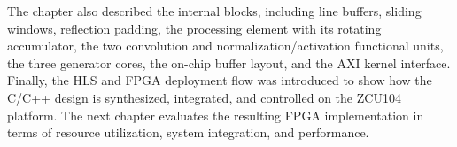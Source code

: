 The chapter also described the internal blocks, including line buffers, sliding windows, reflection padding, the processing element with its rotating accumulator, the two convolution and normalization/activation functional units, the three generator cores, the on-chip buffer layout, and the AXI kernel interface. Finally, the HLS and FPGA deployment flow was introduced to show how the C/C++ design is synthesized, integrated, and controlled on the ZCU104 platform. The next chapter evaluates the resulting FPGA implementation in terms of resource utilization, system integration, and performance.